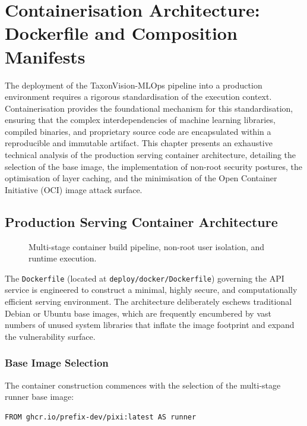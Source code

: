 \chapter{Containerisation Architecture: Dockerfile and Composition Manifests}
\label{ch:containerisation_architecture}

The deployment of the TaxonVision-MLOps pipeline into a production environment requires a rigorous standardisation of the execution context. Containerisation provides the foundational mechanism for this standardisation, ensuring that the complex interdependencies of machine learning libraries, compiled binaries, and proprietary source code are encapsulated within a reproducible and immutable artifact. This chapter presents an exhaustive technical analysis of the production serving container architecture, detailing the selection of the base image, the implementation of non-root security postures, the optimisation of layer caching, and the minimisation of the Open Container Initiative (OCI) image attack surface.

\section{Production Serving Container Architecture}
\label{sec:production_container_architecture}

\begin{figure}[htbp]
\centering

\caption{Multi-stage container build pipeline, non-root user isolation, and runtime execution.}
\label{fig:multistage_container_build}
\end{figure}

The \texttt{Dockerfile} (located at \nolinkurl{deploy/docker/Dockerfile}) governing the API service is engineered to construct a minimal, highly secure, and computationally efficient serving environment. The architecture deliberately eschews traditional Debian or Ubuntu base images, which are frequently encumbered by vast numbers of unused system libraries that inflate the image footprint and expand the vulnerability surface.

\subsection{Base Image Selection}

The container construction commences with the selection of the multi-stage runner base image:
\begin{verbatim}
FROM ghcr.io/prefix-dev/pixi:latest AS runner
\end{verbatim}

